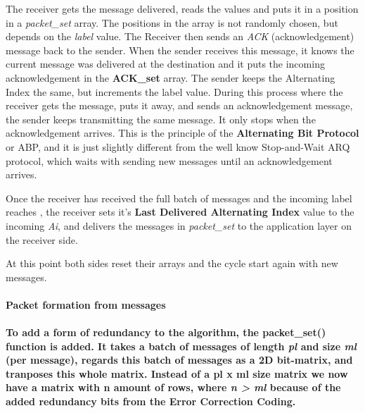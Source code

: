 The receiver gets the message delivered, reads the values and puts it in
a position in a \emph{packet\_set} array. The positions in the array is
not randomly chosen, but depends on the \emph{label} value. The Receiver
then sends an \emph{ACK} (acknowledgement) message back to the sender.
When the sender receives this message, it knows the current message was
delivered at the destination and it puts the incoming acknowledgement in
the \textbf{ACK\_set} array. The sender keeps the Alternating Index the
same, but increments the label value. During this process where the
receiver gets the message, puts it away, and sends an acknowledgement
message, the sender keeps transmitting the same message. It only stops
when the acknowledgement arrives. This is the principle of the
\textbf{Alternating Bit Protocol} or ABP\cite{afek1989self}, and it is
just slightly different from the well know Stop-and-Wait ARQ
protocol\cite{fantacci1986generalised}, which waits with sending new
messages until an acknowledgement arrives.

Once the receiver has received the full batch of messages and the
incoming label reaches \emph{}, the receiver sets it's \textbf{Last
Delivered Alternating Index} value to the incoming \emph{Ai}, and
delivers the messages in \emph{packet\_set} to the application layer on
the receiver side.

At this point both sides reset their arrays and the cycle start again
with new messages.

\paragraph{Packet formation from messages\\\\To add a form of redundancy
to the algorithm, the \textbf{packet\_set()} function is added. It takes
a batch of messages of length \emph{pl} and size \emph{ml} (per
message), regards this batch of messages as a 2D bit-matrix, and
tranposes this whole matrix. Instead of a \textbf{pl x ml} size matrix
we now have a matrix with \textbf{n} amount of rows, where \emph{n
\textgreater{} ml} because of the added redundancy bits from the Error
Correction
Coding.}\label{packet-formation-from-messages-to-add-a-form-of-redundancy-to-the-algorithm-the-packetux5fset-function-is-added.-it-takes-a-batch-of-messages-of-length-pl-and-size-ml-per-message-regards-this-batch-of-messages-as-a-2d-bit-matrix-and-tranposes-this-whole-matrix.-instead-of-a-pl-x-ml-size-matrix-we-now-have-a-matrix-with-n-amount-of-rows-where-n-ml-because-of-the-added-redundancy-bits-from-the-error-correction-coding.}
